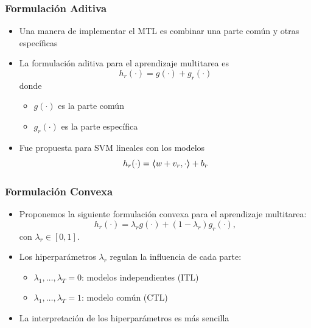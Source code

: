 \documentclass{beamer}
\newcommand\Mark[2][8.4]{%
  \rlap{\tikz[baseline=(current bounding box.south)]{
        \shade[left color=darkgray, right color=maincolor!#2!darkgray]
               (0,0) rectangle ++(#1*#2/100,0.3);}%
  }%
}
\newcommand{\dotp}[2]{\bm{\left\langle} #1, #2 \bm{\right\rangle}}
\newcommand{\ntasks}{T}
\begin{document}
\begin{frame}
    \frametitle{Formulación Aditiva}

    \begin{itemize}
        \item Una manera de implementar el MTL es combinar una parte común y otras específicas
        \item La formulación aditiva para el aprendizaje multitarea es
        \begin{equation}
            \nonumber
            h_r(\cdot) = g(\cdot) + g_r(\cdot) 
        \end{equation}
        donde
        \begin{itemize}
            \item $g(\cdot)$ es la parte común
            \item $g_r(\cdot)$ es la parte específica
        \end{itemize}
        \item Fue propuesta para SVM lineales con los modelos
        \begin{equation}
            \nonumber
            h_r(\cdot) = \dotp{w + v_r}{\cdot} + b_r
        \end{equation}
    \end{itemize}
    
\end{frame}

  

\begin{frame}
      \frametitle{Formulación Convexa}
  
      \begin{itemize}
          \item Proponemos la siguiente formulación convexa para el aprendizaje multitarea:
          \begin{equation}
              \nonumber
              h_r(\cdot) = \lambda_r g(\cdot) + (1 - \lambda_r) g_r(\cdot) ,
          \end{equation}
          con $\lambda_r \in [0,1]$.
          \item Los hiperparámetros $\lambda_r$ regulan la influencia de cada parte:
          \begin{itemize}
              \item $\lambda_1, \ldots, \lambda_\ntasks=0$: modelos independientes (ITL)
              \item $\lambda_1, \ldots, \lambda_\ntasks=1$: modelo común (CTL)
          \end{itemize}
          \item La interpretación de los hiperparámetros es más sencilla \\
      \end{itemize}
      
  \end{frame}
\end{document}
